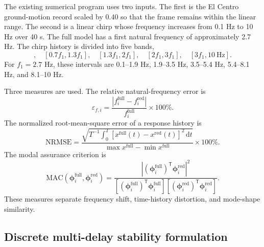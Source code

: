 \documentclass[11pt,a4paper]{article}
\newenvironment{addedblock}{\begingroup\color{addedred}}{\endgroup}
\begin{document}
\begin{addedblock}
The existing numerical program uses two inputs. The first is the El Centro ground-motion record scaled by 0.40 so that the frame remains within the linear range. The second is a linear chirp whose frequency increases from 0.1 Hz to 10 Hz over 40 s. The full model has a first natural frequency of approximately 2.7 Hz. The chirp history is divided into five bands,
\begin{equation}
[0.1,0.7f_1],\quad[0.7f_1,1.3f_1],\quad[1.3f_1,2f_1],\quad[2f_1,3f_1],\quad[3f_1,10\ \mathrm{Hz}].
\label{eq:bands}
\end{equation}
For $f_1=2.7$ Hz, these intervals are 0.1--1.9 Hz, 1.9--3.5 Hz, 3.5--5.4 Hz, 5.4--8.1 Hz, and 8.1--10 Hz.

Three measures are used. The relative natural-frequency error is
\begin{equation}
\varepsilon_{f,i}=\frac{|f_i^{\mathrm{full}}-f_i^{\mathrm{red}}|}{f_i^{\mathrm{full}}}\times100\%.
\label{eq:freqerror}
\end{equation}
The normalized root-mean-square error of a response history is
\begin{equation}
\mathrm{NRMSE}=\frac{\sqrt{T^{-1}\int_0^T\left[x^{\mathrm{full}}(t)-x^{\mathrm{red}}(t)\right]^2\,\mathrm dt}}{\max x^{\mathrm{full}}-\min x^{\mathrm{full}}}\times100\%.
\label{eq:nrmse}
\end{equation}
The modal assurance criterion is
\begin{equation}
\mathrm{MAC}(\bm\phi_i^{\mathrm{full}},\bm\phi_i^{\mathrm{red}})=
\frac{|(\bm\phi_i^{\mathrm{full}})^{\mathsf T}\bm\phi_i^{\mathrm{red}}|^2}{[(\bm\phi_i^{\mathrm{full}})^{\mathsf T}\bm\phi_i^{\mathrm{full}}][(\bm\phi_i^{\mathrm{red}})^{\mathsf T}\bm\phi_i^{\mathrm{red}}]}.
\label{eq:mac}
\end{equation}
These measures separate frequency shift, time-history distortion, and mode-shape similarity.
\end{addedblock}

\subsection{Discrete multi-delay stability formulation}
\end{document}
